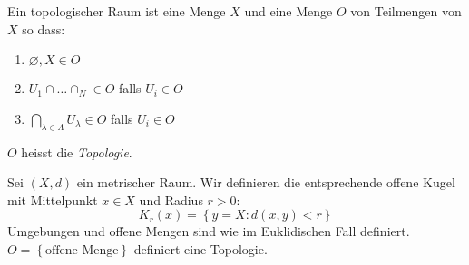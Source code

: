 \begin{Def}
  Ein topologischer Raum ist eine Menge $X$ und eine Menge $O$ von Teilmengen von $X$ so dass:
  \begin{enumerate}
    \item $\varnothing, X\in O$
    \item $U_1\cap\dots\cap_N\in O$ falls $U_i\in O$
    \item $\bigcap_{\lambda\in\Lambda}U_\lambda\in O$ falls $U_i\in O$
  \end{enumerate}
$O$ heisst die {\em Topologie}.
\end{Def}
\begin{Sat}
  Sei $(X,d)$ ein metrischer Raum. Wir definieren die entsprechende offene Kugel mit Mittelpunkt $x\in X$
und Radius $r>0$:
  \[K_r(x)=\left\{ y=X: d(x,y)<r \right\}\]
  Umgebungen und offene Mengen sind wie im Euklidischen Fall definiert. $O=\left\{ \text{offene Menge} \right\}$ definiert eine Topologie.
\end{Sat}
